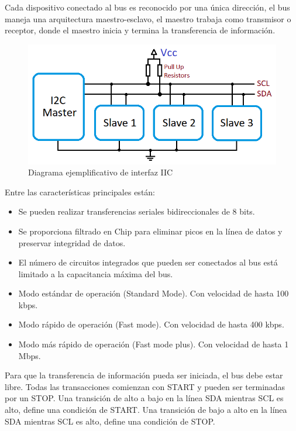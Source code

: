 Cada dispositivo conectado al bus es reconocido por una única dirección, el bus maneja una arquitectura maestro-esclavo, el maestro trabaja como transmisor o receptor, donde el maestro inicia y termina la transferencia de información.

\begin{figure}[H]
	\centering
	\includegraphics[scale=.35]{Capitulo2/images/I2C-Interface.png}
	\caption{Diagrama ejemplificativo de interfaz IIC}
	\label{fig:}
\end{figure}

Entre las características principales están:
\begin{itemize}
	\item Se pueden realizar transferencias seriales bidireccionales de 8 bits.
    \item Se proporciona filtrado en Chip para eliminar picos en la línea de datos y preservar integridad de datos.
    \item El número de circuitos integrados que pueden ser conectados al bus está limitado a la capacitancia máxima del bus.
    \item Modo estándar de operación (Standard Mode). Con velocidad de hasta 100 kbps.
    \item Modo rápido de operación  (Fast mode). Con velocidad de hasta 400 kbps. \item Modo más rápido de operación (Fast mode plus). Con velocidad de hasta 1 Mbps.
\end{itemize}

Para que la transferencia de información pueda ser iniciada, el bus debe estar libre. Todas las transacciones comienzan con START y pueden ser terminadas por un STOP.
Una transición de alto a bajo en la línea SDA mientras SCL es alto, define una condición de START.
Una transición de bajo a alto en la línea SDA mientras SCL es alto, define una condición de STOP.

